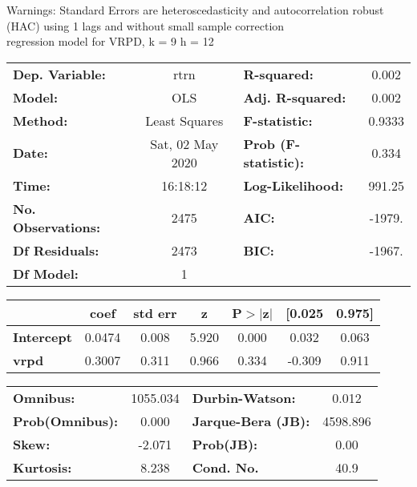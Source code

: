 Warnings: \newline
 [1] Standard Errors are heteroscedasticity and autocorrelation robust (HAC) using 1 lags and without small sample correction\\ 

regression model for VRPD, k = 9 h = 12\begin{center}
\begin{tabular}{lclc}
\toprule
\textbf{Dep. Variable:}    &       rtrn       & \textbf{  R-squared:         } &     0.002   \\
\textbf{Model:}            &       OLS        & \textbf{  Adj. R-squared:    } &     0.002   \\
\textbf{Method:}           &  Least Squares   & \textbf{  F-statistic:       } &    0.9333   \\
\textbf{Date:}             & Sat, 02 May 2020 & \textbf{  Prob (F-statistic):} &    0.334    \\
\textbf{Time:}             &     16:18:12     & \textbf{  Log-Likelihood:    } &    991.25   \\
\textbf{No. Observations:} &        2475      & \textbf{  AIC:               } &    -1979.   \\
\textbf{Df Residuals:}     &        2473      & \textbf{  BIC:               } &    -1967.   \\
\textbf{Df Model:}         &           1      & \textbf{                     } &             \\
\bottomrule
\end{tabular}
\begin{tabular}{lcccccc}
                   & \textbf{coef} & \textbf{std err} & \textbf{z} & \textbf{P$> |$z$|$} & \textbf{[0.025} & \textbf{0.975]}  \\
\midrule
\textbf{Intercept} &       0.0474  &        0.008     &     5.920  &         0.000        &        0.032    &        0.063     \\
\textbf{vrpd}      &       0.3007  &        0.311     &     0.966  &         0.334        &       -0.309    &        0.911     \\
\bottomrule
\end{tabular}
\begin{tabular}{lclc}
\textbf{Omnibus:}       & 1055.034 & \textbf{  Durbin-Watson:     } &    0.012  \\
\textbf{Prob(Omnibus):} &   0.000  & \textbf{  Jarque-Bera (JB):  } & 4598.896  \\
\textbf{Skew:}          &  -2.071  & \textbf{  Prob(JB):          } &     0.00  \\
\textbf{Kurtosis:}      &   8.238  & \textbf{  Cond. No.          } &     40.9  \\
\bottomrule
\end{tabular}
\end{center}

